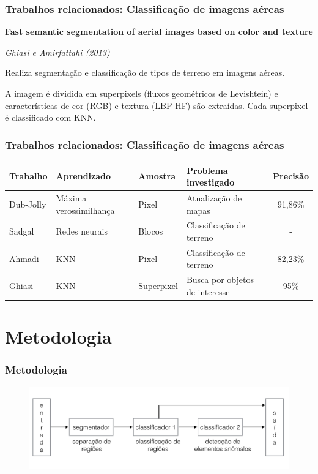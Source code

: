 \documentclass[t]{beamer}
\begin{document}
\begin{frame}
	\frametitle{Trabalhos relacionados: Classificação de imagens aéreas}

	\textbf{Fast semantic segmentation of aerial images based on color and texture}

	\textit{Ghiasi e Amirfattahi (2013)}

	\vspace{0.5cm}

	Realiza segmentação e classificação de tipos de terreno em imagens aéreas.

	\vspace{0.5cm}

	A imagem é dividida em superpixels (fluxos geométricos de Levishtein) e características de cor (RGB) e textura (LBP-HF) são extraídas. Cada superpixel é classificado com KNN.
	
\end{frame}

\begin{frame}[c]
	\frametitle{Trabalhos relacionados: Classificação de imagens aéreas}
	\tiny{
		\begin{table}[h]
		\centering
		\begin{tabulary}{\linewidth}{|L|L|L|L|C|}
		\hline
		\textbf{Trabalho} &  \textbf{Aprendizado} & \textbf{Amostra} & \textbf{Problema investigado} &  \textbf{Precisão} \\ \hline
		Dub-Jolly & Máxima verossimilhança & Pixel      & Atualização de mapas           & 91,86\% \\ \hline
		Sadgal    & Redes neurais         & Blocos     & Classificação de terreno       & -       \\ \hline
		Ahmadi    & KNN                   & Pixel      & Classificação de terreno       & 82,23\% \\ \hline
		Ghiasi    & KNN                   & Superpixel & Busca por objetos de interesse & 95\%    \\ \hline
		\end{tabulary}
		\end{table}
	}
\end{frame}


\section{Metodologia}

\begin{frame}[c]
	\frametitle{Metodologia}
	\begin{figure}[h]
    	\includegraphics[width=\textwidth]{imgs/arquitetura}
	\end{figure}
\end{frame}
\end{document}
